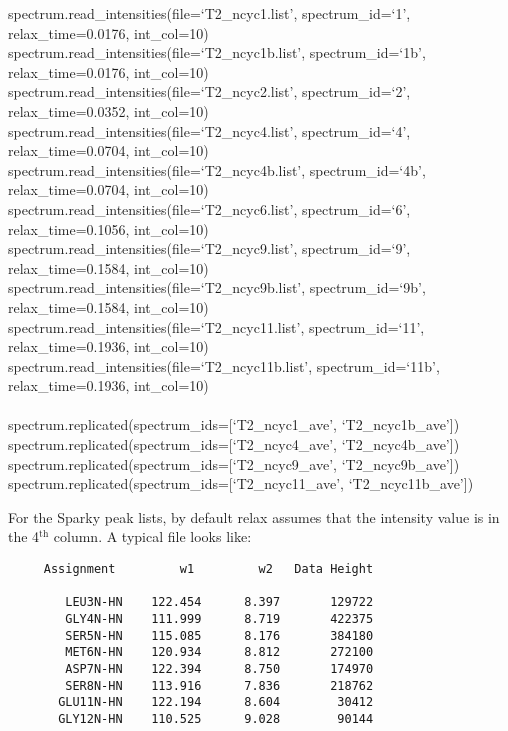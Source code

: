 \begin{exampleenv}
spectrum.read\_intensities(file=`T2\_ncyc1.list',   spectrum\_id=`1',   relax\_time=0.0176, int\_col=10) \\
spectrum.read\_intensities(file=`T2\_ncyc1b.list',  spectrum\_id=`1b',  relax\_time=0.0176, int\_col=10) \\
spectrum.read\_intensities(file=`T2\_ncyc2.list',   spectrum\_id=`2',   relax\_time=0.0352, int\_col=10) \\
spectrum.read\_intensities(file=`T2\_ncyc4.list',   spectrum\_id=`4',   relax\_time=0.0704, int\_col=10) \\
spectrum.read\_intensities(file=`T2\_ncyc4b.list',  spectrum\_id=`4b',  relax\_time=0.0704, int\_col=10) \\
spectrum.read\_intensities(file=`T2\_ncyc6.list',   spectrum\_id=`6',   relax\_time=0.1056, int\_col=10) \\
spectrum.read\_intensities(file=`T2\_ncyc9.list',   spectrum\_id=`9',   relax\_time=0.1584, int\_col=10) \\
spectrum.read\_intensities(file=`T2\_ncyc9b.list',  spectrum\_id=`9b',  relax\_time=0.1584, int\_col=10) \\
spectrum.read\_intensities(file=`T2\_ncyc11.list',  spectrum\_id=`11',  relax\_time=0.1936, int\_col=10) \\
spectrum.read\_intensities(file=`T2\_ncyc11b.list', spectrum\_id=`11b', relax\_time=0.1936, int\_col=10) \\
 \\
spectrum.replicated(spectrum\_ids=[`T2\_ncyc1\_ave', `T2\_ncyc1b\_ave']) \\
spectrum.replicated(spectrum\_ids=[`T2\_ncyc4\_ave', `T2\_ncyc4b\_ave']) \\
spectrum.replicated(spectrum\_ids=[`T2\_ncyc9\_ave', `T2\_ncyc9b\_ave']) \\
spectrum.replicated(spectrum\_ids=[`T2\_ncyc11\_ave', `T2\_ncyc11b\_ave'])
\end{exampleenv}

For the Sparky peak lists, by default relax assumes that the intensity value is in the 4$^\textrm{th}$ column.  A typical file looks like:

{\scriptsize \begin{verbatim}
     Assignment         w1         w2   Data Height

        LEU3N-HN    122.454      8.397       129722
        GLY4N-HN    111.999      8.719       422375
        SER5N-HN    115.085      8.176       384180
        MET6N-HN    120.934      8.812       272100
        ASP7N-HN    122.394      8.750       174970
        SER8N-HN    113.916      7.836       218762
       GLU11N-HN    122.194      8.604        30412
       GLY12N-HN    110.525      9.028        90144
\end{verbatim}}

